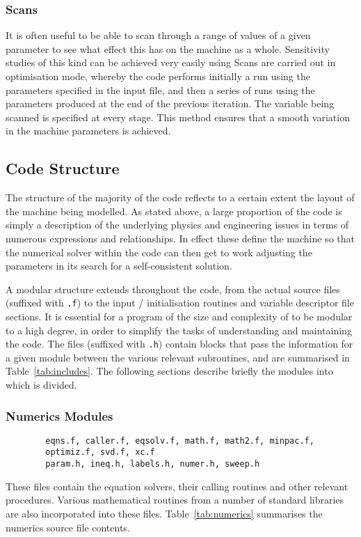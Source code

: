 { %

\subsubsection{Scans}

It is often useful to be able to scan through a range of values of a given
parameter to see what effect this has on the machine as a whole.  Sensitivity
studies of this kind can be achieved very easily using \PSD Scans are carried
out in optimisation mode, whereby the code performs initially a run using the
parameters specified in the input file, and then a series of runs using the
parameters produced at the end of the previous iteration. The variable being
scanned is specified at every stage. This method ensures that a smooth
variation in the machine parameters is achieved.

\subsection{Code Structure}

The structure of the majority of the code reflects to a certain extent the
layout of the machine being modelled. As stated above, a large proportion of
the code is simply a description of the underlying physics and engineering
issues in terms of numerous expressions and relationships. In effect these
define the machine so that the numerical solver within the code can then get
to work adjusting the parameters in its search for a self-consistent solution.

A modular structure extends throughout the code, from the actual \FORT source
files (suffixed with {\tt .f}) to the input / initialisation routines and
variable descriptor file sections. It is essential for a program of the size
and complexity of \PS to be modular to a high degree, in order to simplify the
tasks of understanding and maintaining the code. The \INCLUDE files (suffixed
with {\tt .h}) contain \COMMON blocks that pass the information for a given
module between the various relevant subroutines, and are summarised in
Table~\ref{tab:includes}. The following sections describe briefly the modules
into which \PS is divided.

\subsubsection{Numerics Modules}
\begin{verbatim}
        eqns.f, caller.f, eqsolv.f, math.f, math2.f, minpac.f,
        optimiz.f, svd.f, xc.f
        param.h, ineq.h, labels.h, numer.h, sweep.h
\end{verbatim}
These files contain the equation solvers, their calling routines and
other relevant procedures. Various mathematical routines from a number
of standard libraries are also incorporated into these
files. Table~\ref{tab:numerics} summarises the numerics source file
contents.

}
